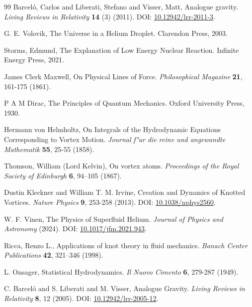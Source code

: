 \documentclass[preprint]{revtex4-2}
\begin{document}
\begin{thebibliography}{99}
Barcel\'o, Carlos and Liberati, Stefano and Visser, Matt,
\newblock Analogue gravity.
\textit{Living Reviews in Relativity} \textbf{14} (3) (2011).
\newblock DOI: \href{https://doi.org/10.12942/lrr-2011-3}{10.12942/lrr-2011-3}.


G. E. Volovik,
\newblock The Universe in a Helium Droplet.
\newblock Clarendon Press, 2003.


Storms, Edmund,
\newblock The Explanation of Low Energy Nuclear Reaction.
\newblock Infinite Energy Press, 2021.


James Clerk Maxwell,
\newblock On Physical Lines of Force.
\textit{Philosophical Magazine} \textbf{21}, 161-175 (1861).


P A M Dirac,
\newblock The Principles of Quantum Mechanics.
\newblock Oxford University Press, 1930.


Hermann von Helmholtz,
\newblock On Integrals of the Hydrodynamic Equations Corresponding to Vortex Motion.
\textit{Journal f"ur die reine und angewandte Mathematik} \textbf{55}, 25-55 (1858).


Thomson, William (Lord Kelvin),
\newblock On vortex atoms.
\textit{Proceedings of the Royal Society of Edinburgh} \textbf{6}, 94--105 (1867).


Dustin Kleckner and William T. M. Irvine,
\newblock Creation and Dynamics of Knotted Vortices.
\textit{Nature Physics} \textbf{9}, 253-258 (2013).
\newblock DOI: \href{https://doi.org/10.1038/nphys2560}{10.1038/nphys2560}.


W. F. Vinen,
\newblock The Physics of Superfluid Helium.
\textit{Journal of Physics and Astronomy} (2024).
\newblock DOI: \href{https://doi.org/10.1017/jfm.2021.943}{10.1017/jfm.2021.943}.


Ricca, Renzo L.,
\newblock Applications of knot theory in fluid mechanics.
\textit{Banach Center Publications} \textbf{42}, 321--346 (1998).


L. Onsager,
\newblock Statistical Hydrodynamics.
\textit{Il Nuovo Cimento} \textbf{6}, 279-287 (1949).


C. Barceló and S. Liberati and M. Visser,
\newblock Analogue Gravity.
\textit{Living Reviews in Relativity} \textbf{8}, 12 (2005).
\newblock DOI: \href{https://doi.org/10.12942/lrr-2005-12}{10.12942/lrr-2005-12}.



\end{thebibliography}
\end{document}
